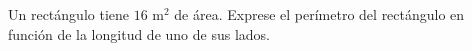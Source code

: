 \item Un rectángulo tiene $16\text{ m}^2$ de área. Exprese el perímetro del rectángulo en función de la longitud de uno de sus lados.
